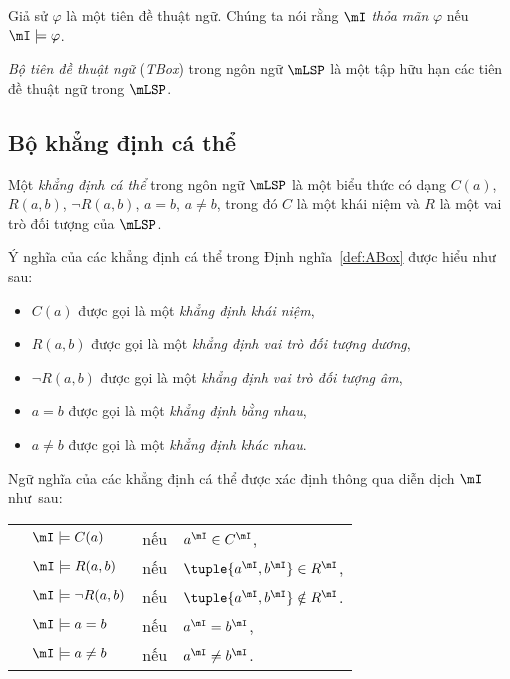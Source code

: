 Giả sử $\varphi$ là một tiên đề thuật ngữ. Chúng ta nói rằng $\mI$ {\em thỏa mãn} $\varphi$ nếu $\mI \models \varphi$.

\begin{Definition}
\label{def:TBox}
	{\em Bộ tiên đề thuật ngữ} ({\em TBox}) trong ngôn ngữ $\mLSP$ là một tập hữu hạn các tiên đề thuật ngữ trong $\mLSP$.\myend
\end{Definition}

\subsection{Bộ khẳng định cá thể}
\label{sec:Chap1.ABox}

\begin{Definition}
\label{def:AssertionIndividual}
Một {\em khẳng định cá thể} trong ngôn ngữ $\mLSP$ là một biểu thức có dạng $C(a)$, $R(a,b)$, $\neg R(a,b)$, $a=b$, $a \not=b$, trong đó $C$ là một khái niệm và $R$ là một vai trò đối tượng của $\mLSP$.\myend
\end{Definition}

Ý nghĩa của các khẳng định cá thể trong Định nghĩa~\ref{def:ABox} được hiểu như sau:
\begin{itemize}
  \item $C(a)$ được gọi là một {\em khẳng định khái niệm},
  \item $R(a,b)$ được gọi là một {\em khẳng định vai trò đối tượng dương},
  \item $\neg R(a,b)$ được gọi là một {\em khẳng định vai trò đối tượng âm},
  \item $a=b$ được gọi là một {\em khẳng định bằng nhau},
  \item $a \not=b$ được gọi là một {\em khẳng định khác nhau}.        
\end{itemize}

Ngữ nghĩa của các khẳng định cá thể được xác định thông qua diễn dịch $\mI$ như~sau:\\[1.5ex]
\begin{tabular}{c l c l}
	& $\mI \models C(a)$      & nếu & $a^\mI \in C^\mI$, \\[0.5ex] 
	& $\mI \models R(a,b)$    & nếu & $\tuple{a^\mI,b^\mI} \in R^\mI$,\\[0.5ex]
	& $\mI \models \neg R(a,b)$ & nếu & $\tuple{a^\mI,b^\mI} \notin R^\mI$.\\[0.5ex]
	& $\mI \models a = b$     & nếu & $a^\mI = b^\mI$, \\[0.5ex]
	& $\mI \models a \neq b$  & nếu & $a^\mI \neq b^\mI$.
\end{tabular}

